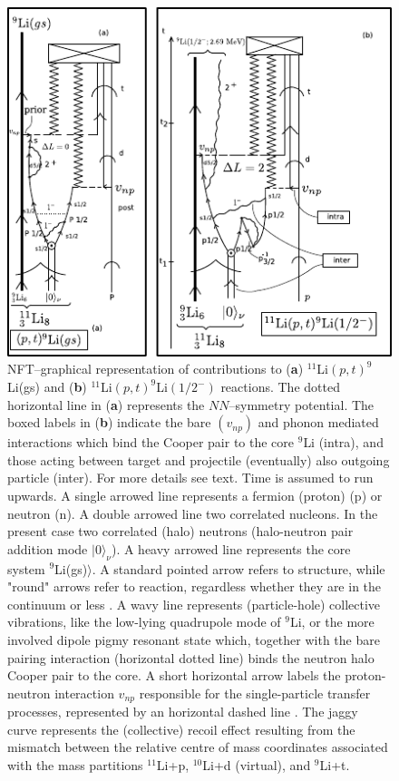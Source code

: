           \begin{figure}
          \centerline {
          \includegraphics*[width=13cm]{introduccion/figs/fig1_9_3}
          }
          \caption{NFT--graphical representation of contributions to (\textbf{a}) $^{11}$Li$(p,t)^9$Li(gs) and (\textbf{b}) $^{11}$Li$(p,t)^9$Li$(1/2^-)$ reactions. The dotted horizontal line in (\textbf{a}) represents the $NN$--symmetry potential. The boxed labels in (\textbf{b}) indicate the bare $(v_{np})$ and phonon mediated interactions which bind the Cooper pair to the core $^9$Li (intra), and those acting between target and projectile (eventually) also outgoing particle (inter). For more details see text.  Time is assumed to run upwards.
          A single arrowed line represents a fermion (proton) (p) or neutron (n). A double arrowed line  two correlated nucleons. In the present case two correlated (halo) neutrons (halo-neutron pair addition mode $|0\rangle_{\nu}$). A heavy arrowed line represents  the core system $^9$Li(gs)$\rangle$. A standard 
          pointed arrow refers to structure, while "round" arrows refer to reaction, regardless whether they are in the continuum or less . A wavy line represents (particle-hole) collective vibrations, like the low-lying quadrupole mode of $^9$Li, or the more involved dipole pigmy resonant state  which, together  with the bare pairing interaction (horizontal dotted line) binds the neutron  halo Cooper pair to the core.  A short  horizontal arrow labels the proton-neutron interaction $v_{np}$ responsible for  the single-particle transfer  processes, represented by an horizontal dashed line . The jaggy curve represents the (collective) recoil effect resulting from the mismatch between the relative centre of mass coordinates  associated with  the mass partitions $^{11}$Li+p, $^{10}$Li+d (virtual), and $^9$Li+t.}
          \label{fig1.9.3}
          \end{figure}
